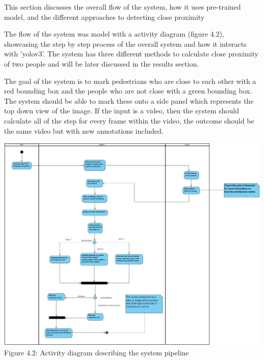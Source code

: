 \documentclass[12pt]{report}
\begin{document}
This section discusses the overall flow of the system, how it uses pre-trained model, and the different approaches to detecting close proximity 

\vspace{2mm}

The flow of the system was model with a activity diagram (figure 4.2), showcasing the step by step process of the overall system and how it interacts with 'yolov3'. The system has three different methods to calculate close proximity of two people and will be later discussed in the results section.

\vspace{2mm}

The goal of the system is to mark pedestrians who are close to each other with a red bounding box and the people who are not close with a green bounding box. The system should be able to mark these onto a side panel which represents the top down view of the image. If the input is a video, then the system should calculate all of the step for every frame within the video, the outcome should be the same video but with new annotations included.
 
\vspace{10mm}

\begin{centering}
	\includegraphics[width=170mm]{./images/system design.jpg}
	{Figure 4.2: Activity diagram describing the system pipeline}
	
\end{centering}

\vspace{10mm}
\end{document}
